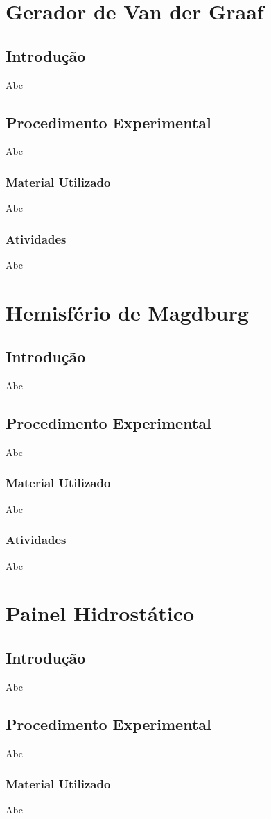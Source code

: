 \documentclass[12pt,a4paper]{article}
\begin{document}
	\section{Gerador de Van der Graaf}
		\subsection{Introdução}
		Abc
		\subsection{Procedimento Experimental}
		Abc
		\subsubsection{Material Utilizado}
		Abc
		\subsubsection{Atividades}
		Abc
	\section{Hemisfério de Magdburg}
		\subsection{Introdução}
		Abc
		\subsection{Procedimento Experimental}
		Abc
		\subsubsection{Material Utilizado}
		Abc
		\subsubsection{Atividades}
		Abc
	\section{Painel Hidrostático}
		\subsection{Introdução}
		Abc
		\subsection{Procedimento Experimental}
		Abc
		\subsubsection{Material Utilizado}
		Abc
\end{document}
